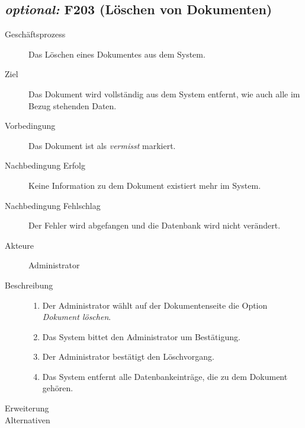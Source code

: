 \subsection{\emph{optional:} F203 (Löschen von Dokumenten)}
\label{F:Löschen}
\begin{description}
  \item[Geschäftsprozess]Das Löschen eines Dokumentes aus dem System.
  \item[Ziel]Das Dokument wird vollständig aus dem System entfernt, wie auch alle im Bezug stehenden Daten.
  \item[Vorbedingung]Das Dokument ist als \emph{vermisst} markiert.
  \item[Nachbedingung Erfolg]Keine Information zu dem Dokument existiert mehr im System.
  \item[Nachbedingung Fehlschlag]Der Fehler wird abgefangen und die Datenbank wird nicht verändert.
  \item[Akteure]Administrator
  \item[Beschreibung]\hfill
    \begin{enumerate}
      \item Der Administrator wählt auf der Dokumentenseite die Option \emph{Dokument löschen}.
      \item Das System bittet den Administrator um Bestätigung.
      \item Der Administrator bestätigt den Löschvorgang.
      \item Das System entfernt alle Datenbankeinträge, die zu dem Dokument gehören.
    \end{enumerate}
  \item[Erweiterung]
  \item[Alternativen]
\end{description}

